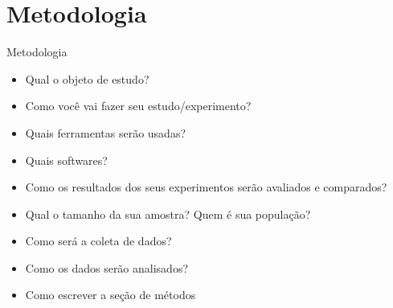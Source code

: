\section{Metodologia}

\begin{frame}	
	\begin{block}{Metodologia}
		 \begin{itemize}
			  \item Qual o objeto de estudo?
			  \item Como você vai fazer seu estudo/experimento?
			  \item Quais ferramentas serão usadas?
			  \item Quais softwares?
			  \item Como os resultados dos seus experimentos serão avaliados e comparados?
			  \item Qual o tamanho da sua amostra? Quem é sua população?
			  \item Como será a coleta de dados?
		      \item Como os dados serão analisados?
		      \item Como escrever a seção de métodos \href{http://posgraduando.com/como-escrever-material-e-metodos/}{\color{blue}{Métodos}} \cite{POSGRADUANDO_2018}
		  \end{itemize}
	\end{block}
\end{frame}
